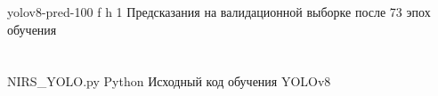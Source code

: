 \begin{appendices}
{yolov8-pred-100} %
{f} %
{h} %
{1\textwidth} %
{Предсказания на валидационной выборке после 73 эпох обучения} %
\chapter{}

{NIRS_YOLO.py} %
{Python} %
{Исходный код обучения YOLOv8} %

	

\end{appendices}